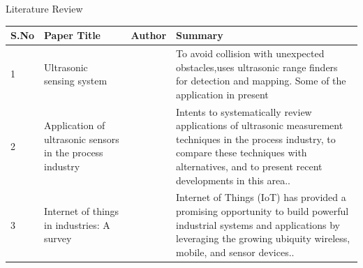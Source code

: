 \documentclass{beamer}
\begin{document}
\begin{frame}[shrink=1]{Literature Review}
\begin{center}
    \hspace{1cm}\begin{tabular}{| p{1cm} | p{2.5cm} | p{2cm} | p{5cm} |}
    \hline
    S.No & Paper Title & Author & Summary            \\
    \hline
    1 & Ultrasonic sensing system
 & \citet{steiner2018ultrasonic}
 & To avoid collision with unexpected obstacles,uses ultrasonic range finders for detection and mapping. Some of the application in present  
 \\
    \hline
    2 & Application of ultrasonic sensors in the process industry & \citet{hauptmann2002application} & Intents to systematically review applications of ultrasonic measurement techniques in the process industry, to compare these techniques with alternatives, and to present recent developments in this area.. \\
    \hline
    3  & Internet of things in industries: A survey & \citet{da2014internet}
 & Internet of Things (IoT) has provided a promising opportunity to build powerful industrial systems and applications by leveraging the growing ubiquity wireless, mobile, and sensor devices..\\
    \hline
    \end{tabular}
\end{center}
\end{frame}
\end{document}
